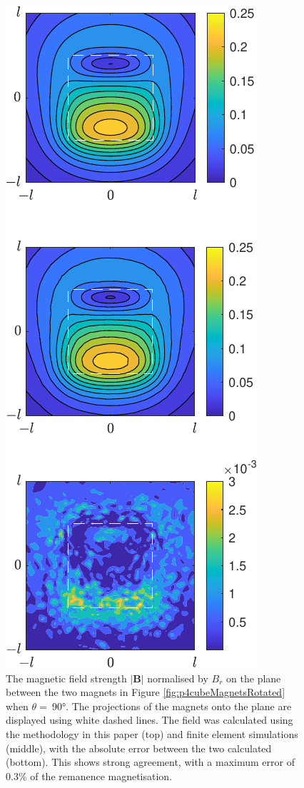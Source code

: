 \begin{figure}
	\centering
	\includegraphics[width=0.5\linewidth]{p4/p4FIG12}
	\caption{The magnetic field strength \(\left| \mathbf{B} \right|\) normalised by \(B_r\) on the plane between the two magnets in Figure \ref{fig:p4cubeMagnetsRotated} when \(\theta =\ \)\ang{90}. The projections of the magnets onto the plane are displayed using white dashed lines. The field was calculated using the methodology in this paper (top) and finite element simulations (middle), with the absolute error between the two calculated (bottom). This shows strong agreement, with a maximum error of 0.3\% of the remanence magnetisation.}
	\label{fig:p4cubeMagnetRotatedField}
\end{figure}